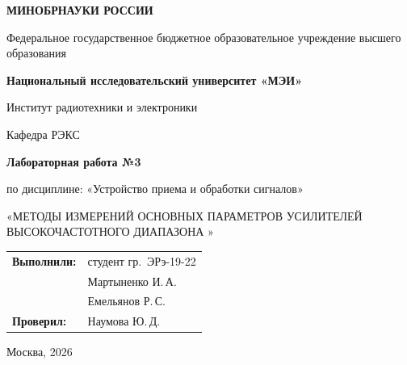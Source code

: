 \begin{titlepage}
    \centering
    {\bfseries МИНОБРНАУКИ РОССИИ\par}
    Федеральное государственное бюджетное образовательное учреждение высшего образования \\
    {\bfseries Национальный исследовательский университет «МЭИ»\par}
    \vspace{1cm}
    Институт радиотехники и электроники\par
    Кафедра РЭКС\par
    \vspace{3cm}
    
    {\bfseries\large Лабораторная работа №3\par}
    \vspace{0.5cm}
    {\large по дисциплине: «Устройство приема и обработки сигналов»\par}
    
    \vspace{0.5cm}
    {\large «МЕТОДЫ ИЗМЕРЕНИЙ ОСНОВНЫХ ПАРАМЕТРОВ 
УСИЛИТЕЛЕЙ ВЫСОКОЧАСТОТНОГО ДИАПАЗОНА »\par}
    \vspace{3.5cm}
 \vspace{1.5cm}
\noindent\hfill
\begin{tabular}{@{}ll@{}}
    \textbf{Выполнили:} & студент гр.~ЭРэ-19-22 \\
                        & Мартыненко И.\,А. \\
                        & Емельянов Р.\,С. \\

    \textbf{Проверил:}  & Наумова Ю.\,Д.
\end{tabular}   
    \vfill
    {Москва, 2026}
\end{titlepage}